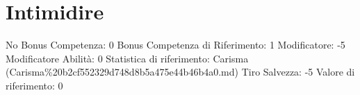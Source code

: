 \section{Intimidire}\label{intimidire}

\begin{description}
\tightlist
\item[Tags: ABI]
No Bonus Competenza: 0 Bonus Competenza di Riferimento: 1 Modificatore:
-5 Modificatore Abilità: 0 Statistica di riferimento: Carisma
(Carisma\%20b2cf552329d748d8b5a475e44b46b4a0.md) Tiro Salvezza: -5
Valore di riferimento: 0
\end{description}
